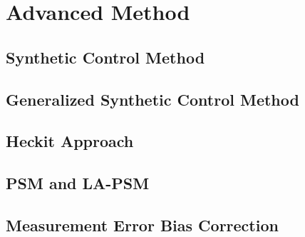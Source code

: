 \documentclass{article}
\begin{document}
\section{Advanced Method}

\subsection{Synthetic Control Method}

\subsection{Generalized Synthetic Control Method}

\subsection{Heckit Approach}

\subsection{PSM and LA-PSM}

\subsection{Measurement Error Bias Correction}

\pagebreak


% 
\end{document}
